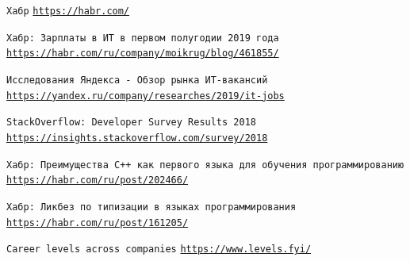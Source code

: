 \documentclass[10pt]{beamer}
\begin{document}
\begin{frame}[allowframebreaks]
\begin{thebibliography}{10}
{  
  \texttt{Хабр}
  \newblock \href{https://habr.com/}{\texttt{https://habr.com/}}
  
  \texttt{Хабр: Зарплаты в ИТ в первом полугодии 2019 года}
  \newblock \href{https://habr.com/ru/company/moikrug/blog/461855/}{\texttt{https://habr.com/ru/company/moikrug/blog/461855/}}
  
  \texttt{Исследования Яндекса - Обзор рынка ИТ-вакансий}
  \newblock \href{https://yandex.ru/company/researches/2019/it-jobs}{\texttt{https://yandex.ru/company/researches/2019/it-jobs}}
  
  \texttt{StackOverflow: Developer Survey Results
2018}
  \newblock \href{https://insights.stackoverflow.com/survey/2018}{\texttt{https://insights.stackoverflow.com/survey/2018}}
  
  \texttt{Хабр: Преимущества C++ как первого языка для обучения программированию}
  \newblock \href{https://habr.com/ru/post/202466/}{\texttt{https://habr.com/ru/post/202466/}}
  
  \texttt{Хабр: Ликбез по типизации в языках программирования}
  \newblock \href{https://habr.com/ru/post/161205/}{\texttt{https://habr.com/ru/post/161205/}}
  
  \texttt{Career levels across companies}
  \newblock \href{https://www.levels.fyi/}{\texttt{https://www.levels.fyi/}}

}


  \end{thebibliography}
\end{frame}
\end{document}

